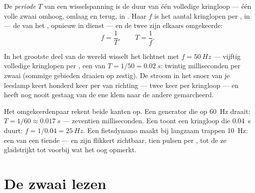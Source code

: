 \begin{definition}\label{def:g9:alternating-current:period}
De \emph{periode} $T$ van een wisselspanning is de
duur van één volledige kringloop --- één volle zwaai omhoog,
omlaag en terug, in . Haar \emph{} $f$ is
het aantal kringlopen per , in  --- de
 van het , opnieuw in dienst --- en de
twee zijn elkaars omgekeerde:
\[
f = \frac{1}{T}, \qquad T = \frac{1}{f}.
\]
\end{definition}

\begin{proposition}\label{prop:g9:alternating-current:mains}
In het grootste deel van de wereld wisselt het lichtnet met
$f = \qty{50}{Hz}$ --- vijftig volledige kringlopen per , een
 van $T = 1/50 = \qty{0.02}{s}$: twintig milliseconden
per zwaai (sommige gebieden draaien op zestig). De stroom in het snoer
van je leeslamp keert honderd keer per  van richting --- twee
keer per kringloop --- en heeft nog nooit gestaag van de ene
klem naar de andere gemarcheerd.
\end{proposition}

\begin{example}\label{ex:g9:alternating-current:arithmetic}
Het omgekeerdenpaar rekent beide kanten op. Een generator die op
\qty{60}{Hz} draait: $T = 1/60 \approx \qty{0.017}{s}$ --- zeventien
milliseconden. Een  toont een kringloop die
\qty{0.04}{s} duurt: $f = 1/0.04 = \qty{25}{Hz}$. Een fietsdynamo maakt
bij langzaam trappen \qty{10}{Hz}: een  van een tiende
 --- en zijn  flikkert zichtbaar, tien pulsen per ,
tot de  ze gladstrijkt tot voorbij wat het oog opmerkt.
\end{example}

\section{De zwaai lezen}

